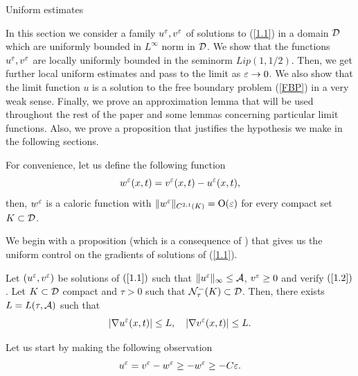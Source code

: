 \begin{section}{Uniform estimates}
\setcounter{equation}{0}

In this section we consider a family $u^{\varepsilon}, v^{\varepsilon}$ of solutions to
(\ref{1.1}) in a domain $\cal D$ which are uniformly bounded in $L^{\infty}$ 
norm in $\cal D$. We show that the functions $u^{\varepsilon}, v^{\varepsilon}$ are locally 
uniformly bounded in the seminorm $Lip(1,1/2)$.
Then, we get further local uniform estimates and pass to the limit as 
$\varepsilon\to 0$. We also show that the limit function $u$ is a solution to the 
free boundary problem (\ref{FBP}) in a very weak sense. Finally, we prove an approximation 
lemma that will be used throughout the rest of the paper and some lemmas
concerning particular limit functions. Also, we prove a proposition that
justifies the hypothesis we make in the following sections.

For convenience, let us define the following function
\begin{equation}
\label{w}
w^{\varepsilon}(x,t) = v^{\varepsilon}(x,t) - u^{\varepsilon}(x,t),
\end{equation}
then, $w^\varepsilon$ is a caloric function with $\| w^\varepsilon\|_{C^{2,1}(K)}=\mbox{O}(\varepsilon)$ for 
every compact set $K\subset {\cal D}$.

We begin with a proposition (which is a consequence of \cite{C}) that gives 
us the uniform control on the gradients of solutions of (\ref{1.1}).

\begin{prop}
\label{regx}
Let $(u^{\varepsilon},v^{\varepsilon})$ be solutions of $(\ref{1.1})$ such that 
$\| u^{\varepsilon} \|_{\infty}\leq {\cal A}$, $v^{\varepsilon}\ge0$ and verify $(\ref{1.2})$. 
Let $K\subset {\cal D}$ compact and $\tau>0$ such that 
${\cal N}_{\tau}^{-}(K)\subset {\cal D}$. Then, there exists 
$L=L(\tau,{\cal A})$ such that
$$|\nabla u^{\varepsilon}(x,t)|\leq L,\quad |\nabla v^{\varepsilon}(x,t)|\leq L.$$
\end{prop}

\begin{pf}
Let us start by making the following observation
$$u^{\varepsilon}=v^{\varepsilon}-w^{\varepsilon}\ge -w^{\varepsilon}\ge -C\varepsilon.$$


\end{pf}
\end{section}

